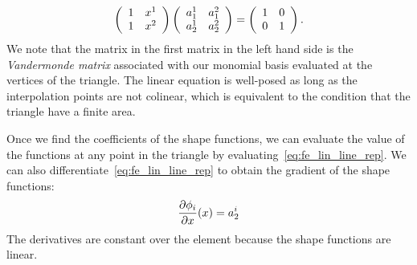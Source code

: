 \begin{equation*}
  \bmat{cc}
  1 & x^1 \\
  1 & x^2 \\
  \emat
  \bmat{cc}
  a_1^1 & a_1^2 \\
  a_2^1 & a_2^2 \\
  \emat
  =
  \bmat{cc}
  1 & 0 \\
  0 & 1 \\
  \emat.
\end{equation*}
We note that the matrix in the first matrix in the left hand side is the \emph{Vandermonde matrix} associated with our monomial basis evaluated at the vertices of the triangle.  The linear equation is well-posed as long as the interpolation points are not colinear, which is equivalent to the condition that the triangle have a finite area.

Once we find the coefficients of the shape functions, we can evaluate the value of the functions at any point in the triangle by evaluating~\eqref{eq:fe_lin_line_rep}. We can also differentiate~\eqref{eq:fe_lin_line_rep} to obtain the gradient of the shape functions:
\begin{align*}
  \pp{\phi_i}{x}(x) = a_2^i
\end{align*}
The derivatives are constant over the element because the shape functions are linear.

